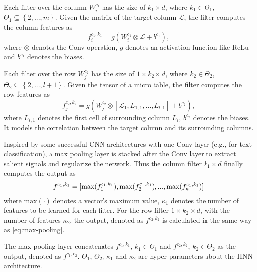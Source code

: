 \documentclass{article}
\begin{document}
Each filter over the column $W^{c_1}_i$ has the size of $k_1  \times d $, where $k_1 \in \Theta_1$, $\Theta_1 \subseteq \left\{ 2,...,m \right\}$.
Given the matrix of the target column $\mathcal{L}$, 
the filter computes the column features as
\begin{equation}
f^{c_1,k_1}_i = g(W^{c_1}_i \otimes \mathcal{L} + b^{c_1}),
\end{equation}
where $\otimes$ denotes the Conv operation, 
$g$ denotes an activation function like ReLu
and $b^{c_1}$ denotes the biases.

Each filter over the row 
$W^{c_2}_j$ has the size of $1 \times k_2 \times d$, 
where $k_2 \in \Theta_2$, $\Theta_2 \subseteq \left\{ 2,...,l+1 \right\}$.
Given the tensor of a micro table,
the filter computes the row features as 
\begin{equation}
    f^{c_2,k_2}_j = g(W^{c_2}_j \otimes \left[ \mathcal{L}_1, L_{1,1},...,L_{l,1} \right] + b^{c_2}),
\end{equation}
where $L_{i,1}$ denotes the first cell of surrounding column $L_i$, $b^{c_2}$ denotes the biases.
It models the correlation between the target column and its surrounding columns.

Inspired by some successful CNN architectures with one Conv layer (e.g., \cite{kim2014convolutional} for text classification),
a max pooling layer is stacked after the Conv layer to extract salient signals and regularize the network.
Thus the column filter $k_1 \times d$ finally computes the output as
\begin{equation}\label{eq:max-pooling}
    f^{c_1, k_1} = [\text{max}(f_1^{c_1, k_1}),\text{max}(f_2^{c_1, k_1}), ..., \text{max}(f_{\kappa_1}^{c_1, k_1})] \\
\end{equation}
where $\text{max}(\cdot)$ denotes a vector's maximum value, 
$\kappa_1$ denotes the number of features to be learned for each filter.
For the row filter $1 \times k_2 \times d$, with the number of features $\kappa_2$,
the output,
denoted as $f^{c_2, k_2}$ 
is calculated in the same way as \eqref{eq:max-pooling}.

The max pooling layer concatenates $f^{c_1,k_1}$, $k_1 \in \Theta_1$ and $f^{c_2,k_2}$, $k_2 \in \Theta_2$ as the output, denoted as $f^{c_1,c_2}$.
$\Theta_1$, $\Theta_2$, $\kappa_1$ and $\kappa_2$ are hyper parameters about the HNN architecture.
\end{document}

